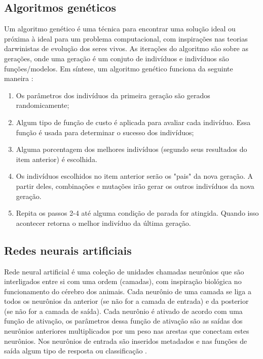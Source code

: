 \documentclass[conference]{IEEEtran}
\begin{document}
\subsection{Algoritmos genéticos}
Um algoritmo genético é uma técnica para encontrar uma solução ideal ou próxima à ideal para um problema computacional, com inspirações nas teorias darwinistas de evolução dos seres vivos. As iterações do algoritmo são sobre as gerações, onde uma geração é um conjuto de indivíduos e indivíduos são funções/modelos. Em síntese, um algoritmo genético funciona da seguinte maneira \cite{b3}:

\begin{enumerate}
\item Os parâmetros dos indivíduos da primeira geração são gerados randomicamente;

\item Algum tipo de função de custo é aplicada para avaliar cada indivíduo. Essa função é usada para determinar o sucesso dos indivíduos;

\item Alguma porcentagem dos melhores indivíduos (segundo seus resultados do item anterior) é escolhida.

\item Os indivíduos escolhidos no item anterior serão os "pais" da nova geração. A partir deles, combinações e mutações irão gerar os outros indivíduos da nova geração.

\item Repita os passos 2-4 até alguma condição de parada for atingida. Quando isso acontecer retorna o melhor indivíduo da última geração.

\end{enumerate}


\subsection{Redes neurais artificiais}
Rede neural artificial é uma coleção de unidades chamadas neurônios que são interligados entre si com uma ordem (camadas), com inspiração biológica no funcionamento do cérebro dos animais. Cada neurônio de uma camada se liga a todos os neurônios da anterior (se não for a camada de entrada) e da posterior (se não for a camada de saída). Cada neurônio é ativado de acordo com uma função de ativação, os parâmetros dessa função de ativação são as saídas dos neurônios anteriores multiplicados por um peso nas arestas que conectam estes neurônios. Nos neurônios de entrada são inseridos metadados e nas funções de saída algum tipo de resposta ou classificação \cite{b4}.\\
\end{document}
